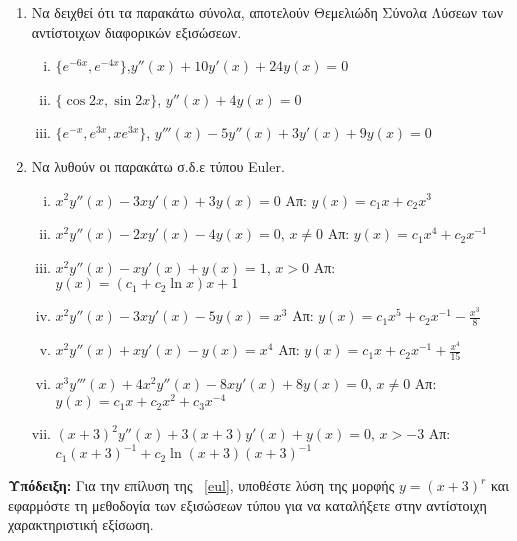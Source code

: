 


\everymath{\displaystyle}




\thispagestyle{empty}

\begin{center}
\end{center}

\vspace{\baselineskip}

\begin{enumerate}
    \item Να δειχθεί ότι τα  παρακάτω σύνολα, αποτελούν Θεμελιώδη Σύνολα Λύσεων 
        των αντίστοιχων διαφορικών εξισώσεων.

        \begin{enumerate}[i)]
            \item $ \{ e^{-6x}, e^{-4x} \} $,\quad $ y''(x)+10y'(x)+24y(x)=0 $ 
            \item $ \{ \cos{2x}, \sin{2x} \}$, \quad $ y''(x)+4y(x)=0 $
            \item $ \{ e^{-x}, e^{3x}, xe^{3x} \} $, \quad 
                $ y'''(x)-5y''(x)+3y'(x)+9y(x)=0 $
        \end{enumerate}

    \item Να λυθούν οι παρακάτω σ.δ.ε τύπου Euler.

        \begin{enumerate}[i)]
            \item $ x^{2}y''(x)-3xy'(x)+3y(x)=0 $ 
                \hfill Απ: $ y(x)=c_{1}x + c_{2}x^{3} $
            \item $ x^{2}y''(x)-2xy'(x)-4y(x)=0 $,\; $ x \neq 0 $ 
                \hfill Απ: $ y(x)=c_{1}x^{4}+ c_{2} x^{-1} $ 
            \item $ x^{2}y''(x)-xy'(x)+y(x)=1 $,\; $ x>0 $ 
                \hfill Απ: $ y(x)=(c_{1}+c_{2} \ln{x})x + 1 $  
            \item $ x^{2}y''(x)-3xy'(x)-5y(x)=x^{3} $ 
                \hfill Απ: $ y(x)=c_{1}x^{5}+ c_{2} x^{-1}- \frac{x^{3}}{8} $ 
            \item $ x^{2}y''(x)+xy'(x)-y(x)=x^{4} $ 
                \hfill Απ: $ y(x)=c_{1}x+c_{2}x^{-1}+ \frac{x^{4}}{15} $ 
            \item $ x^{3}y'''(x)+4x^{2}y''(x)-8xy'(x)+8y(x)=0 $,\; $ x \neq 0 $ 
                \hfill Απ: $y(x)=c_{1}x+c_{2}x^{2}+c_{3}x^{-4}$ 
            \item \label{eul} $ (x+3)^{2}y''(x)+3(x+3)y'(x)+y(x)=0 $,\; $ x>-3 $ 
                \hfill Απ: $\scriptstyle{ c_{1} (x+3)^{-1} + c_{2}\ln(x+3)(x+3)^{-1}} $
        \end{enumerate}

\end{enumerate}

\vfill

\textbf{Υπόδειξη:} Για την επίλυση της ~\eqref{eul}, υποθέστε λύση της μορφής 
$ y=(x+3)^{r} $ και εφαρμόστε τη μεθοδογία των εξισώσεων τύπου 
 για να καταλήξετε στην αντίστοιχη χαρακτηριστική εξίσωση.


